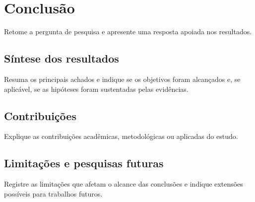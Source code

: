 \chapter{Conclusão}

Retome a pergunta de pesquisa e apresente uma resposta apoiada nos resultados.

\section{Síntese dos resultados}

Resuma os principais achados e indique se os objetivos foram alcançados e, se
aplicável, se as hipóteses foram sustentadas pelas evidências.

\section{Contribuições}

Explique as contribuições acadêmicas, metodológicas ou aplicadas do estudo.

\section{Limitações e pesquisas futuras}

Registre as limitações que afetam o alcance das conclusões e indique extensões
possíveis para trabalhos futuros.

